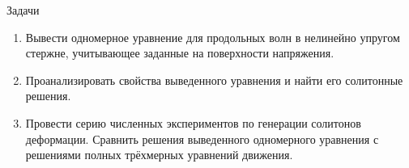 \documentclass[usenames,dvipsnames]{beamer}
\begin{document}
 
\begin{frame}{Задачи}
\begin{enumerate}
	\item Вывести одномерное уравнение для продольных волн в нелинейно упругом стержне, учитывающее заданные на поверхности напряжения.
	\item Проанализировать свойства выведенного уравнения и найти его солитонные решения. 
	\item Провести серию численных экспериментов по генерации солитонов деформации. Сравнить решения выведенного одномерного уравнения с решениями полных трёхмерных уравнений движения.
\end{enumerate}
\end{frame}
\end{document}
